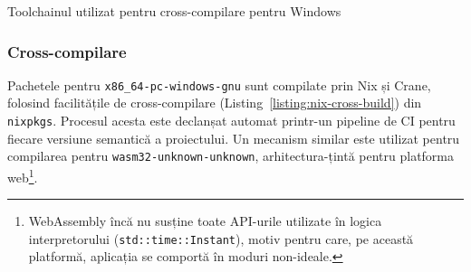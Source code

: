 \documentclass[a4paper]{article}
\begin{document}
\begin{listing}
	\inputminted{nix}{codeblocks/cross.nix}
	\caption{Toolchainul utilizat pentru cross-compilare pentru Windows}
	\label{listing:nix-cross-build}
\end{listing}

\subsubsection{Cross-compilare}
Pachetele pentru \texttt{x86\_64-pc-windows-gnu} sunt compilate prin Nix și Crane, folosind facilitățile de cross-compilare (Listing~\ref{listing:nix-cross-build})
din \texttt{nixpkgs}. Procesul acesta este declanșat automat printr-un pipeline de CI pentru fiecare versiune semantică a proiectului. Un
mecanism similar este utilizat pentru compilarea pentru \texttt{wasm32-unknown-unknown}, arhitectura-țintă pentru platforma web\footnote{
	WebAssembly încă nu susține toate API-urile utilizate în logica interpretorului (\texttt{std::time::Instant}),
	motiv pentru care, pe această platformă, aplicația se comportă în moduri non-ideale.}.


\end{document}
